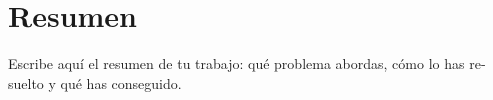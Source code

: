 \chapter*{Resumen}
\begin{otherlanguage}{spanish}

Escribe aquí el resumen de tu trabajo: qué problema abordas, cómo lo has
resuelto y qué has conseguido.

\mostrarPalabrasClave %

\end{otherlanguage}
